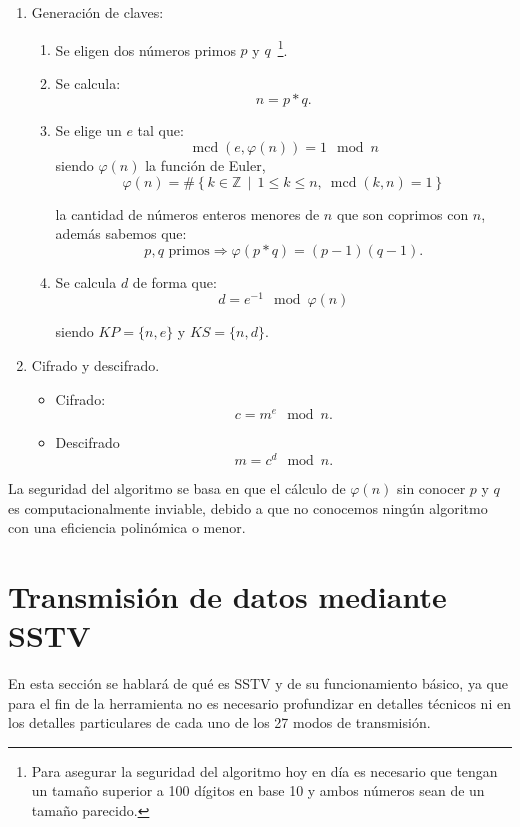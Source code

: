  \begin{enumerate}
    \item Generación de claves:
        \begin{enumerate}
            \item Se eligen dos números primos $p$ y $q$~\footnote{Para asegurar la seguridad del algoritmo hoy en día es necesario que tengan un tamaño superior a 100 dígitos en base 10 y ambos números sean de un tamaño parecido.}.
            \item Se calcula:
            \[n= p*q.\]
            \item Se elige un $e$ tal que:
            \[\operatorname{mcd}(e,\varphi(n)) = 1 \mod n\]
            siendo $\varphi(n)$ la función de Euler,\[
\varphi(n) = \#\left\{ k \in \mathbb{Z} \,\middle|\, 1 \leq k \leq n,\ \operatorname{mcd}(k, n) = 1 \right\}
\]

la cantidad de números enteros menores de $n$ que son coprimos con $n$, además sabemos que: \[p, q \text{ primos} \Rightarrow \varphi(p*q) = (p - 1)(q - 1).\]
            \item Se calcula $d$ de forma que:
            \[d=e^{-1} \mod \varphi(n)\]

            
            siendo $KP=\{n,e\}$ y $KS=\{n,d\}$.
         \end{enumerate}
    \item Cifrado y descifrado.
    \begin{itemize}
    \item Cifrado:
    \[c=m^e \mod n.\]
    \item Descifrado
    \[m=c^d \mod n.\]
    \end{itemize}
 \end{enumerate}


La seguridad del algoritmo se basa en que el cálculo de $\varphi(n)$ sin conocer $p$ y $q$ es computacionalmente inviable, debido a que no conocemos ningún algoritmo con una eficiencia polinómica o menor.



\section{Transmisión de datos mediante SSTV}
En esta sección se hablará de qué es SSTV y de su funcionamiento básico, ya que para el fin de la herramienta no es necesario profundizar en detalles técnicos ni en los detalles particulares de cada uno de los 27 modos de transmisión.\\

